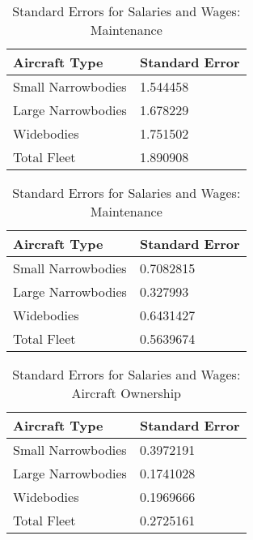 \begin{table}[htbp]
    \centering
    \begin{minipage}{0.45\textwidth} %
        \centering
        \caption{Standard Errors for Salaries and Wages: Per Diem/ Personnel}
        \begin{tabular}{@{}ll@{}}
            \toprule
            \textbf{Aircraft Type} & \textbf{Standard Error} \\ \midrule
            Small Narrowbodies     & 1.544458                \\
            Large Narrowbodies     & 1.678229                \\
            Widebodies             & 1.751502                \\
            Total Fleet            & 1.890908                \\ \bottomrule
        \end{tabular}
    \end{minipage}%
    \hspace{0.05\textwidth} %
    \begin{minipage}{0.45\textwidth}
        \centering
        \caption{Standard Errors for Salaries and Wages: Maintenance}
        \begin{tabular}{@{}ll@{}}
            \toprule
            \textbf{Aircraft Type} & \textbf{Standard Error} \\ \midrule
            Small Narrowbodies     & 0.7082815               \\
            Large Narrowbodies     & 0.327993                \\
            Widebodies             & 0.6431427               \\
            Total Fleet            & 0.5639674               \\ \bottomrule
        \end{tabular}
    \end{minipage}
\end{table}

\begin{table}[htbp]
    \centering
    \begin{minipage}{0.45\textwidth} %
        \centering
        \caption{Standard Errors for Salaries and Wages: Aircraft Ownership}
        \begin{tabular}{@{}ll@{}}
            \toprule
            \textbf{Aircraft Type} & \textbf{Standard Error} \\ \midrule
            Small Narrowbodies     & 0.3972191               \\
            Large Narrowbodies     & 0.1741028               \\
            Widebodies             & 0.1969666               \\
            Total Fleet            & 0.2725161               \\ \bottomrule
        \end{tabular}
    \end{minipage}
\end{table}